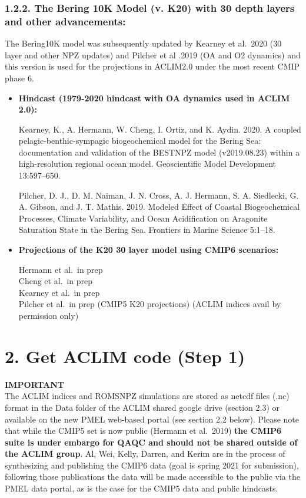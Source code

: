 \documentclass[
]{article}
\begin{document}
\hypertarget{the-bering-10k-model-v.-k20-with-30-depth-layers-and-other-advancements}{%
\subsubsection{1.2.2. The Bering 10K Model (v. K20) with 30 depth layers
and other
advancements:}\label{the-bering-10k-model-v.-k20-with-30-depth-layers-and-other-advancements}}

The Bering10K model was subsequently updated by Kearney et al.~2020 (30
layer and other NPZ updates) and Pilcher et al .2019 (OA and O2
dynamics) and this version is used for the projections in ACLIM2.0 under
the most recent CMIP phase 6.

\begin{itemize}
\item
  \textbf{Hindcast (1979-2020 hindcast with OA dynamics used in ACLIM
  2.0):}

  Kearney, K., A. Hermann, W. Cheng, I. Ortiz, and K. Aydin. 2020. A
  coupled pelagic-benthic-sympagic biogeochemical model for the Bering
  Sea: documentation and validation of the BESTNPZ model (v2019.08.23)
  within a high-resolution regional ocean model. Geoscientific Model
  Development 13:597--650.

  Pilcher, D. J., D. M. Naiman, J. N. Cross, A. J. Hermann, S. A.
  Siedlecki, G. A. Gibson, and J. T. Mathis. 2019. Modeled Effect of
  Coastal Biogeochemical Processes, Climate Variability, and Ocean
  Acidification on Aragonite Saturation State in the Bering Sea.
  Frontiers in Marine Science 5:1--18.
\item
  \textbf{Projections of the K20 30 layer model using CMIP6 scenarios:}

  Hermann et al.~in prep\\
  Cheng et al.~in prep\\
  Kearney et al.~in prep\\
  Pilcher et al.~in prep (CMIP5 K20 projections) (ACLIM indices avail by
  permission only)
\end{itemize}

\hypertarget{get-aclim-code-step-1}{%
\section{2. Get ACLIM code (Step 1)}\label{get-aclim-code-step-1}}

\textbf{IMPORTANT}\\
The ACLIM indices and ROMSNPZ simulations are stored as netcdf files
(.nc) format in the Data folder of the ACLIM shared google drive
(section 2.3) or available on the new PMEL web-based portal (see section
2.2 below). Please note that while the CMIP5 set is now public (Hermann
et al.~2019) \textbf{the CMIP6 suite is under embargo for QAQC and
should not be shared outside of the ACLIM group}. Al, Wei, Kelly,
Darren, and Kerim are in the process of synthesizing and publishing the
CMIP6 data (goal is spring 2021 for submission), following those
publications the data will be made accessible to the public via the PMEL
data portal, as is the case for the CMIP5 data and public hindcasts.
\end{document}
